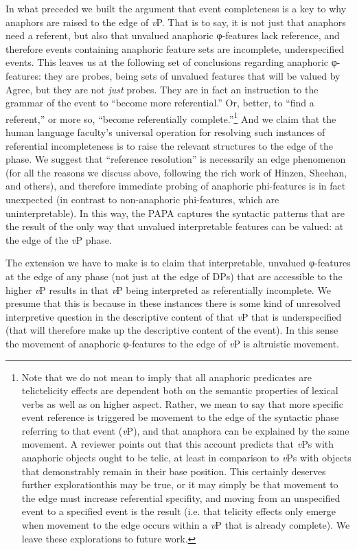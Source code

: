 \documentclass[output=paper
,modfonts
,nonflat
]{langsci/langscibook}
\begin{document}
In what preceded we built the argument that event completeness is a key to why anaphors are raised to the edge of \textit{v}P. That is to say, it is not just that anaphors need a referent, but also that unvalued anaphoric φ-features lack reference, and therefore events containing anaphoric feature sets are incomplete, underspecified events. This leaves us at the following set of conclusions regarding anaphoric φ-features: they are probes, being sets of unvalued features that will be valued by Agree, but they are not \textit{just} probes. They are in fact an instruction to the grammar of the event to ``become more referential.'' Or, better, to ``find a referent,'' or more so, ``become referentially complete.''\footnote{Note that we do not mean to imply that all anaphoric predicates are telic\textemdash telicity effects are dependent both on the semantic properties of lexical verbs as well as on higher aspect. Rather, we mean to say that more specific event reference is triggered be movement to the edge of the syntactic phase referring to that event (\textit{v}P), and that anaphora can be explained by the same movement. A reviewer points out that this account predicts that \textit{v}Ps with anaphoric objects ought to be telic, at least in comparison to \textit{v}Ps with objects that demonstrably remain in their base position. This certainly deserves further exploration\textemdash this may be true, or it may simply be that movement to the edge must increase referential specifity, and moving from an unspecified event to a specified event is the result (i.e. that telicity effects only emerge when movement to the edge occurs within a \textit{v}P that is already complete). We leave these explorations to future work.} And we claim that the human language faculty's universal operation for resolving such instances of referential incompleteness is to raise the relevant structures to the edge of the phase. We suggest that ``reference resolution'' is necessarily an edge phenomenon (for all the reasons we discuss above, following the rich work of Hinzen, Sheehan, and others), and therefore immediate probing of anaphoric phi-features is in fact unexpected (in contrast to non-anaphoric phi-features, which are uninterpretable). In this way, the PAPA captures the syntactic patterns that are the result of the only way that unvalued interpretable features can be valued: at the edge of the \textit{v}P phase.

The extension we have to make is to claim that interpretable, unvalued φ-features at the edge of any phase (not just at the edge of DPs) that are accessible to the higher \textit{v}P results in that \textit{v}P being interpreted as referentially incomplete. We presume that this is because in these instances there is some kind of unresolved interpretive question in the descriptive content of that \textit{v}P that is underspecified (that will therefore make up the descriptive content of the event). In this sense the movement of anaphoric φ-features to the edge of \textit{v}P is altruistic movement. 
\end{document}
